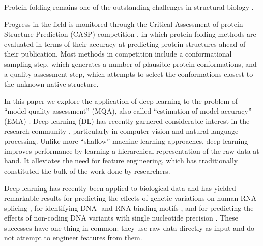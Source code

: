 
Protein folding remains one of the outstanding challenges in
structural biology \cite{dill2012folding}. 



Progress in the field is monitored through the Critical Assessment of
protein Structure Prediction (CASP) competition \cite{moult1995large},
in which protein folding methods are evaluated in terms of their
accuracy at predicting protein structures ahead of their
publication. Most methods in competition include a conformational
sampling step, which generates a number of plausible protein
conformations, and a quality assessment step, which attempts to select
the conformations closest to the unknown native structure.

In this paper we explore the application of deep learning to the
problem of ``model quality assessment'' (MQA), also called
``estimation of model accuracy'' (EMA) \cite{kryshtafovych2015}. Deep
learning (DL) has recently garnered considerable interest in the
research community \cite{lecun2015deep}, particularly in computer
vision and natural language processing. Unlike more ``shallow''
machine learning approaches, deep learning improves performance by
learning a hierarchical representation of the raw data at hand. It
alleviates the need for feature engineering, which has traditionally
constituted the bulk of the work done by researchers.

Deep learning has recently been applied to biological data and has
yielded remarkable results for predicting the effects of genetic
variations on human RNA splicing \cite{xiong2015human}, for
identifying DNA- and RNA-binding
motifs \cite{alipanahi2015predicting}, and for predicting the effects
of non-coding DNA variants with single nucleotide
precision \cite{zhou2015predicting}. These successes have one thing in
common: they use raw data directly as input and do not attempt to
engineer features from them.


